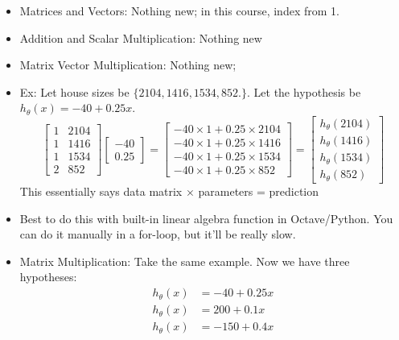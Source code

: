 \documentclass[10pt]{article}
\begin{document}
\begin{itemize}
  \item Matrices and Vectors: Nothing new; in this course, index from 1.
  \item Addition and Scalar Multiplication: Nothing new
  \item Matrix Vector Multiplication: Nothing new;
  \item Ex: Let house sizes be $\{2104, 1416, 1534, 852.\}$. Let the hypothesis be $h_{\theta}(x) = -40 + 0.25x$.
    \begin{equation*}
      \begin{bmatrix}
        1 & 2104 \\
        1 & 1416 \\
        1 & 1534 \\
        2 & 852 
      \end{bmatrix}
      \begin{bmatrix}
        -40 \\ 
        0.25
      \end{bmatrix} 
      =
      \begin{bmatrix}
        -40 \times 1 + 0.25 \times 2104 \\
        -40 \times 1 + 0.25 \times 1416 \\
        -40 \times 1 + 0.25 \times 1534 \\
        -40 \times 1 + 0.25 \times 852
      \end{bmatrix}
      =
      \begin{bmatrix}
        h_{\theta}(2104)\\
        h_{\theta}(1416)\\
        h_{\theta}(1534)\\
        h_{\theta}(852)
      \end{bmatrix}
    \end{equation*}
    This essentially says data matrix $\times$ parameters = prediction
  \item Best to do this with built-in linear algebra function in Octave/Python. You can do it manually in a for-loop, but it'll be really slow.
  \item Matrix Multiplication: Take the same example. Now we have three hypotheses:
    \begin{align*}
      h_{\theta}(x) &= -40 + 0.25x \\
      h_{\theta}(x) &= 200 + 0.1x \\
      h_{\theta}(x) &= -150 + 0.4x 
    \end{align*}

\end{itemize}
\end{document}
